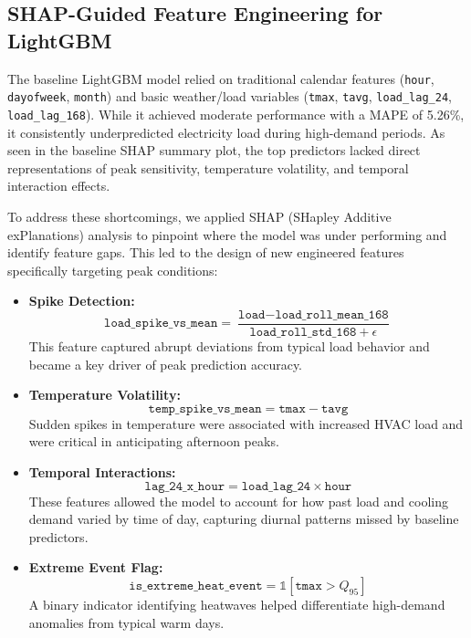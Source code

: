 \documentclass[final,numbered]{ifacconf}
\begin{document}
\subsection*{SHAP-Guided Feature Engineering for LightGBM}

The baseline LightGBM model relied on traditional calendar features (\texttt{hour}, \texttt{dayofweek}, \texttt{month}) and basic weather/load variables (\texttt{tmax}, \texttt{tavg}, \texttt{load\_lag\_24}, \texttt{load\_lag\_168}). While it achieved moderate performance with a MAPE of 5.26\%, it consistently underpredicted electricity load during high-demand periods. As seen in the baseline SHAP summary plot, the top predictors lacked direct representations of peak sensitivity, temperature volatility, and temporal interaction effects.

To address these shortcomings, we applied SHAP (SHapley Additive exPlanations) analysis to pinpoint where the model was under performing and identify feature gaps. This led to the design of new engineered features specifically targeting peak conditions:

\begin{itemize}
    \item \textbf{Spike Detection:} 
    \[
        \texttt{load\_spike\_vs\_mean} = \frac{\texttt{load} - \texttt{load\_roll\_mean\_168}}{\texttt{load\_roll\_std\_168} + \epsilon}
    \]
    This feature captured abrupt deviations from typical load behavior and became a key driver of peak prediction accuracy.
    \newline
    \item \textbf{Temperature Volatility:}
    \[
        \texttt{temp\_spike\_vs\_mean} = \texttt{tmax} - \texttt{tavg}
    \]
    Sudden spikes in temperature were associated with increased HVAC load and were critical in anticipating afternoon peaks.
    \newline
    \item \textbf{Temporal Interactions:}
    \[
        \texttt{lag\_24\_x\_hour} = \texttt{load\_lag\_24}\times\texttt{hour}
    \]
    These features allowed the model to account for how past load and cooling demand varied by time of day, capturing diurnal patterns missed by baseline predictors.
    \newline
    \item \textbf{Extreme Event Flag:}
    \[
        \texttt{is\_extreme\_heat\_event} = \mathbb{1}[\texttt{tmax} > Q_{95}]
    \]
    A binary indicator identifying heatwaves helped differentiate high-demand anomalies from typical warm days.
\end{itemize}
\end{document}
